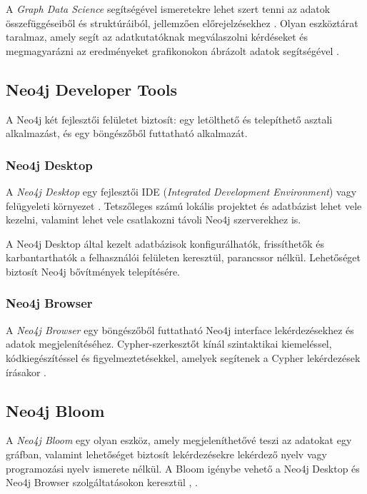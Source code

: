 A \textit{Graph Data Science} segítségével ismeretekre lehet szert tenni az adatok összefüggéseiből és struktúráiból, jellemzően előrejelzésekhez . Olyan eszköztárat taralmaz, amely segít az adatkutatóknak megválaszolni kérdéseket és megmagyarázni az eredményeket grafikonokon ábrázolt adatok segítségével \cite{neo4j-graph-data-science}.

\subsection{Neo4j Developer Tools}

A Neo4j két fejlesztői felületet biztosít: egy letölthető és telepíthető asztali alkalmazást, és egy böngészőből futtatható alkalmazát.

\subsubsection{Neo4j Desktop}

A \textit{Neo4j Desktop} egy fejlesztői IDE (\textit{Integrated Development Environment}) vagy felügyeleti környezet \cite{neo4j-desktop}.
Tetszőleges számú lokális projektet és adatbázist lehet vele kezelni, valamint lehet vele csatlakozni távoli Neo4j szerverekhez is. 

A Neo4j Desktop által kezelt adatbázisok konfigurálhatók, frissíthetők és karbantarthatók a felhasználói felületen keresztül, parancssor nélkül. Lehetőséget biztosít Neo4j bővítmények telepítésére.

\subsubsection{Neo4j Browser}

A \textit{Neo4j Browser} egy böngészőből futtatható Neo4j interface lekérdezésekhez és adatok megjelenítéséhez. Cypher-szerkesztőt kínál szintaktikai kiemeléssel, kódkiegészítéssel és figyelmeztetésekkel, amelyek segítenek a Cypher lekérdezések írásakor \cite{neo4j-browser}.

\subsection{Neo4j Bloom}

A \textit{Neo4j Bloom} egy olyan eszköz, amely megjeleníthetővé teszi az adatokat egy gráfban, valamint lehetőséget biztosít lekérdezésekre lekérdező nyelv vagy programozási nyelv ismerete nélkül. A Bloom igénybe vehető a Neo4j Desktop és Neo4j Browser szolgáltatásokon keresztül \cite{neo4j-bloom1}, \cite{neo4j-bloom2}.

